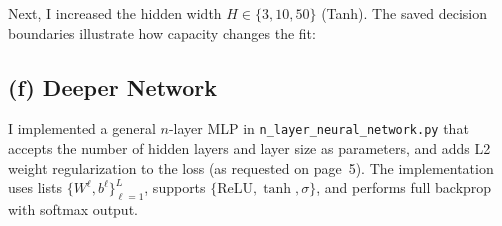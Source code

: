 \documentclass[11pt]{article}
\begin{document}
Next, I increased the hidden width \(H\in\{3,10,50\}\) (Tanh). The saved decision boundaries illustrate how capacity changes the fit:
\begin{center}
\quad
{}\quad
{}
\end{center}

\subsection{(f) Deeper Network}
I implemented a general \(n\)-layer MLP in \texttt{n\_layer\_neural\_network.py} that accepts the number of hidden layers and layer size as parameters, and adds L2 weight regularization to the loss (as requested on page~5). The implementation uses lists \(\{W^\ell,b^\ell\}_{\ell=1}^L\), supports \(\{\mathrm{ReLU},\tanh,\sigma\}\), and performs full backprop with softmax output.
\end{document}
